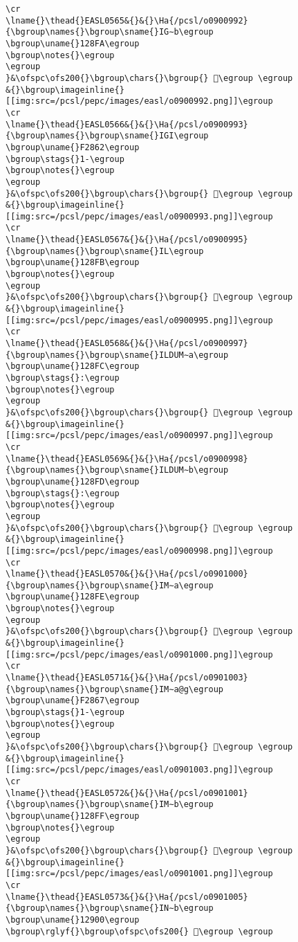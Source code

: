 \begin{verbatim}
\cr
\lname{}\thead{}EASL0565&{}&{}\Ha{/pcsl/o0900992}{\bgroup\names{}\bgroup\sname{}IG∼b\egroup
\bgroup\uname{}128FA\egroup
\bgroup\notes{}\egroup
\egroup
}&\ofspc\ofs200{}\bgroup\chars{}\bgroup{} 𒣺\egroup \egroup
&{}\bgroup\imageinline{}[[img:src=/pcsl/pepc/images/easl/o0900992.png]]\egroup
\cr
\lname{}\thead{}EASL0566&{}&{}\Ha{/pcsl/o0900993}{\bgroup\names{}\bgroup\sname{}IGI\egroup
\bgroup\uname{}F2862\egroup
\bgroup\stags{}1-\egroup
\bgroup\notes{}\egroup
\egroup
}&\ofspc\ofs200{}\bgroup\chars{}\bgroup{} 󲡢\egroup \egroup
&{}\bgroup\imageinline{}[[img:src=/pcsl/pepc/images/easl/o0900993.png]]\egroup
\cr
\lname{}\thead{}EASL0567&{}&{}\Ha{/pcsl/o0900995}{\bgroup\names{}\bgroup\sname{}IL\egroup
\bgroup\uname{}128FB\egroup
\bgroup\notes{}\egroup
\egroup
}&\ofspc\ofs200{}\bgroup\chars{}\bgroup{} 𒣻\egroup \egroup
&{}\bgroup\imageinline{}[[img:src=/pcsl/pepc/images/easl/o0900995.png]]\egroup
\cr
\lname{}\thead{}EASL0568&{}&{}\Ha{/pcsl/o0900997}{\bgroup\names{}\bgroup\sname{}ILDUM∼a\egroup
\bgroup\uname{}128FC\egroup
\bgroup\stags{}:\egroup
\bgroup\notes{}\egroup
\egroup
}&\ofspc\ofs200{}\bgroup\chars{}\bgroup{} 𒣼\egroup \egroup
&{}\bgroup\imageinline{}[[img:src=/pcsl/pepc/images/easl/o0900997.png]]\egroup
\cr
\lname{}\thead{}EASL0569&{}&{}\Ha{/pcsl/o0900998}{\bgroup\names{}\bgroup\sname{}ILDUM∼b\egroup
\bgroup\uname{}128FD\egroup
\bgroup\stags{}:\egroup
\bgroup\notes{}\egroup
\egroup
}&\ofspc\ofs200{}\bgroup\chars{}\bgroup{} 𒣽\egroup \egroup
&{}\bgroup\imageinline{}[[img:src=/pcsl/pepc/images/easl/o0900998.png]]\egroup
\cr
\lname{}\thead{}EASL0570&{}&{}\Ha{/pcsl/o0901000}{\bgroup\names{}\bgroup\sname{}IM∼a\egroup
\bgroup\uname{}128FE\egroup
\bgroup\notes{}\egroup
\egroup
}&\ofspc\ofs200{}\bgroup\chars{}\bgroup{} 𒣾\egroup \egroup
&{}\bgroup\imageinline{}[[img:src=/pcsl/pepc/images/easl/o0901000.png]]\egroup
\cr
\lname{}\thead{}EASL0571&{}&{}\Ha{/pcsl/o0901003}{\bgroup\names{}\bgroup\sname{}IM∼a@g\egroup
\bgroup\uname{}F2867\egroup
\bgroup\stags{}1-\egroup
\bgroup\notes{}\egroup
\egroup
}&\ofspc\ofs200{}\bgroup\chars{}\bgroup{} 󲡧\egroup \egroup
&{}\bgroup\imageinline{}[[img:src=/pcsl/pepc/images/easl/o0901003.png]]\egroup
\cr
\lname{}\thead{}EASL0572&{}&{}\Ha{/pcsl/o0901001}{\bgroup\names{}\bgroup\sname{}IM∼b\egroup
\bgroup\uname{}128FF\egroup
\bgroup\notes{}\egroup
\egroup
}&\ofspc\ofs200{}\bgroup\chars{}\bgroup{} 𒣿\egroup \egroup
&{}\bgroup\imageinline{}[[img:src=/pcsl/pepc/images/easl/o0901001.png]]\egroup
\cr
\lname{}\thead{}EASL0573&{}&{}\Ha{/pcsl/o0901005}{\bgroup\names{}\bgroup\sname{}IN∼b\egroup
\bgroup\uname{}12900\egroup
\bgroup\rglyf{}\bgroup\ofspc\ofs200{} 𒤀\egroup \egroup

\end{verbatim}
